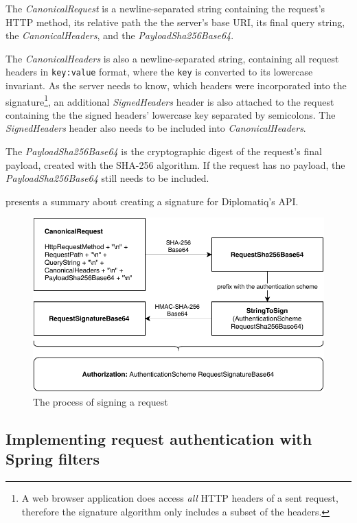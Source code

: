 The \emph{CanonicalRequest} is a newline-separated string containing the request's HTTP method, its relative path the the server's base URI, its final query string, the \emph{CanonicalHeaders}, and the \emph{PayloadSha256Base64}.

The \emph{CanonicalHeaders} is also a newline-separated string, containing all request headers in \lstinline{key:value} format, where the \lstinline{key} is converted to its lowercase invariant. As the server needs to know, which headers were incorporated into the signature\footnote{A web browser application does access \emph{all} HTTP headers of a sent request, therefore the signature algorithm only includes a subset of the headers.}, an additional \emph{SignedHeaders} header is also attached to the request containing the the signed headers' lowercase key separated by semicolons. The \emph{SignedHeaders} header also needs to be included into \emph{CanonicalHeaders}.

The \emph{PayloadSha256Base64} is the cryptographic digest of the request's final payload, created with the SHA-256 algorithm. If the request has no payload, the \emph{PayloadSha256Base64} still needs to be included.

 presents a summary about creating a signature for Diplomatiq's API.

\begin{figure}[!htb]
    \includegraphics[width=\textwidth]{figures/request-signature.pdf}
    \caption{The process of signing a request}
    \label{fig:request-signature}
\end{figure}

\subsection{Implementing request authentication with Spring filters}

